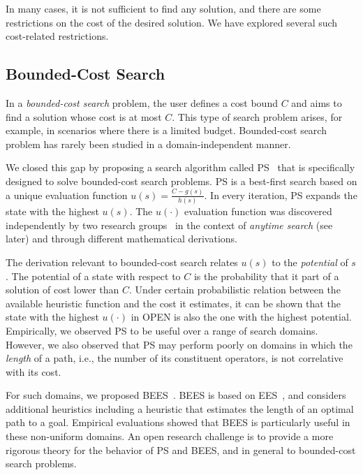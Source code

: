 \documentclass{article}
\newcommand\roni[1]{\nb{\textbf{Roni:}}{orange}{#1}}
\newcommand{\open}{\textsc{OPEN}\xspace}
\newcommand{\ees}{\ac{EES}\xspace}
\newcommand{\bees}{\ac{BEES}\xspace}
\newcommand{\ps}{\ac{PS}\xspace}
\begin{document}
In many cases, it is not sufficient to find any solution, and there are some restrictions on the cost of the desired solution. We have explored several such cost-related restrictions. 

\subsection{Bounded-Cost Search}
In a \emph{bounded-cost search} problem, the user defines a cost bound $C$ and aims to find a solution whose cost is at most $C$. This type of search problem arises, for example, in scenarios where there is a limited budget. Bounded-cost search problem has rarely been studied in a domain-independent manner. 

We closed this gap by proposing a search algorithm called \ps~\cite{SternFBPSG14} that is specifically designed to solve bounded-cost search problems. 
\ps is a best-first search based on a unique evaluation function $u(s)=\frac{C-g(s)}{h(s)}$.
In every iteration, \ps expands the state with the highest $u(s)$. The $u(\cdot)$ evaluation function was discovered independently by two research groups~\cite{PotentialSearch2011,van2011anytime} in the context of \emph{anytime search} (see later) and through different mathematical derivations. 

The derivation relevant to bounded-cost search relates $u(s)$ to the \emph{potential} of $s$. The potential of a state with respect to $C$ is the probability that it part of a solution of cost lower than $C$. Under certain probabilistic relation between the available heuristic function and the cost it estimates, it can be shown that the state with the highest $u(\cdot)$ in \open is also the one with the highest potential. 
Empirically, we observed \ps to be useful over a range of search domains. However, we also observed that \ps may perform poorly on domains in which the \emph{length} of a path, i.e., the number of its constituent operators, is not correlative with its cost. 

For such domains, we proposed \bees~\cite{ThayerSFR12}. \bees is based on \ees~\cite{ThayerR11BoundedSuboptimalSearch}, and considers additional heuristics including a heuristic that estimates the length of an optimal path to a goal. %
Empirical evaluations showed that BEES is particularly useful in these non-uniform domains. %
An open research challenge is to provide a more rigorous theory for the behavior of \ps and \bees, and in general to bounded-cost search problems. 
\end{document}
